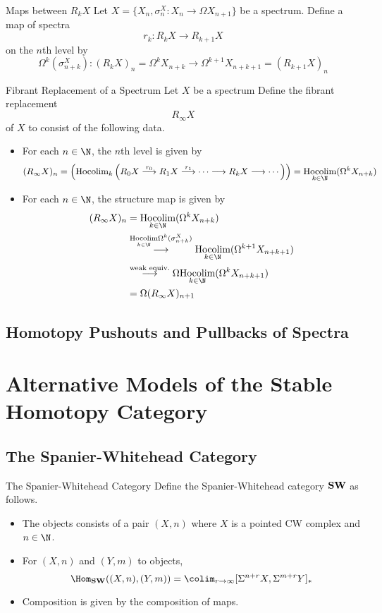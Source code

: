 \documentclass[a4paper]{article}
\begin{document}
\begin{defn}{Maps between $R_kX$}{} Let $X=\{X_n,\sigma_n^X:X_n\to\Omega X_{n+1}\}$ be a spectrum. Define a map of spectra $$r_k:R_kX\to R_{k+1}X$$ on the $n$th level by $$\Omega^k(\sigma_{n+k}^X):(R_kX)_n=\Omega^kX_{n+k}\to\Omega^{k+1}X_{n+k+1}=(R_{k+1}X)_n$$
\end{defn}

\begin{defn}{Fibrant Replacement of a Spectrum}{} Let $X$ be a spectrum Define the fibrant replacement $$R_\infty X$$ of $X$ to consist of the following data. 
\begin{itemize}
\item For each $n\in\N$, the $n$th level is given by $$(R_\infty X)_n=\left(\text{Hocolim}_k\left(R_0X\overset{r_0}{\longrightarrow}R_1X\overset{r_1}{\longrightarrow}\cdots\longrightarrow R_kX\longrightarrow\cdots\right)\right)=\underset{k\in\N}{\text{Hocolim}}(\Omega^k X_{n+k})$$
\item For each $n\in\N$, the structure map is given by
\begin{align*}
(R_\infty X)_n&=\underset{k\in\N}{\text{Hocolim}}(\Omega^k X_{n+k})\\
&\overset{\underset{k\in\N}{\text{Hocolim}}\Omega^k(\sigma_{n+k}^X)}{\longrightarrow}\underset{k\in\N}{\text{Hocolim}}(\Omega^{k+1}X_{n+k+1})\\
&\overset{\text{weak equiv.}}{\longrightarrow}\Omega\underset{k\in\N}{\text{Hocolim}}(\Omega^kX_{n+k+1})\\
&=\Omega(R_\infty X)_{n+1}
\end{align*}
\end{itemize}
\end{defn}

\subsection{Homotopy Pushouts and Pullbacks of Spectra}

\pagebreak
\section{Alternative Models of the Stable Homotopy Category}
\subsection{The Spanier-Whitehead Category}
\begin{defn}{The Spanier-Whitehead Category}{} Define the Spanier-Whitehead category $\bold{SW}$ as follows. 
\begin{itemize}
\item The objects consists of a pair $(X,n)$ where $X$ is a pointed CW complex and $n\in\N$. 
\item For $(X,n)$ and $(Y,m)$ to objects, $$\Hom_{\bold{SW}}((X,n),(Y,m))=\colim_{r\to\infty}[\Sigma^{n+r}X,\Sigma^{m+r}Y]_\ast$$
\item Composition is given by the composition of maps. 
\end{itemize}
\end{defn}
\end{document}
